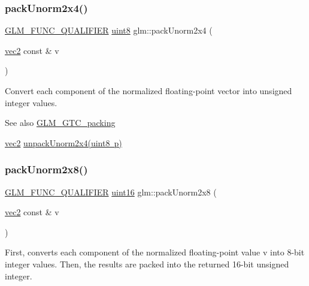 \subsubsection{\texorpdfstring{pack\+Unorm2x4()}{packUnorm2x4()}}
{\footnotesize\ttfamily \mbox{\hyperlink{setup_8hpp_a33fdea6f91c5f834105f7415e2a64407}{G\+L\+M\+\_\+\+F\+U\+N\+C\+\_\+\+Q\+U\+A\+L\+I\+F\+I\+ER}} \mbox{\hyperlink{group__gtc__type__precision_ga1a7dcd8aac97cc8020817c94049deff2}{uint8}} glm\+::pack\+Unorm2x4 (\begin{DoxyParamCaption}\item[{\mbox{\hyperlink{group__core__types_gaa1618f51db67eaa145db101d8c8431d8}{vec2}} const \&}]{v }\end{DoxyParamCaption})}

Convert each component of the normalized floating-\/point vector into unsigned integer values.

\begin{DoxySeeAlso}{See also}
\mbox{\hyperlink{group__gtc__packing}{G\+L\+M\+\_\+\+G\+T\+C\+\_\+packing}} 

\mbox{\hyperlink{group__core__types_gaa1618f51db67eaa145db101d8c8431d8}{vec2}} \mbox{\hyperlink{group__gtc__packing_ga3afb0452954320f2d83fe6f38cb24147}{unpack\+Unorm2x4(uint8 p)}} 
\end{DoxySeeAlso}
\mbox{\label{group__gtc__packing_ga833288fc0d4a79f19d0db75a6843bfe6}} 
\subsubsection{\texorpdfstring{pack\+Unorm2x8()}{packUnorm2x8()}}
{\footnotesize\ttfamily \mbox{\hyperlink{setup_8hpp_a33fdea6f91c5f834105f7415e2a64407}{G\+L\+M\+\_\+\+F\+U\+N\+C\+\_\+\+Q\+U\+A\+L\+I\+F\+I\+ER}} \mbox{\hyperlink{group__gtc__type__precision_gad8c2939e1fdd8e5828b31d95c52255d5}{uint16}} glm\+::pack\+Unorm2x8 (\begin{DoxyParamCaption}\item[{\mbox{\hyperlink{group__core__types_gaa1618f51db67eaa145db101d8c8431d8}{vec2}} const \&}]{v }\end{DoxyParamCaption})}

First, converts each component of the normalized floating-\/point value v into 8-\/bit integer values. Then, the results are packed into the returned 16-\/bit unsigned integer.

